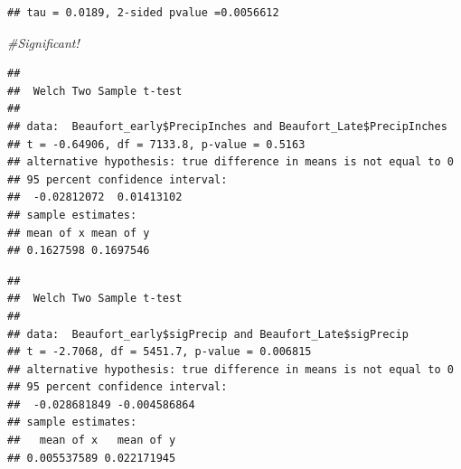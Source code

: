 \documentclass[
  12pt,
]{article}
\newenvironment{Shaded}{\begin{snugshade}}{\end{snugshade}}
\newcommand{\CommentTok}[1]{\textcolor[rgb]{0.56,0.35,0.01}{\textit{#1}}}
\newcommand{\FunctionTok}[1]{\textcolor[rgb]{0.00,0.00,0.00}{#1}}
\newcommand{\NormalTok}[1]{#1}
\newcommand{\SpecialCharTok}[1]{\textcolor[rgb]{0.00,0.00,0.00}{#1}}
\begin{document}
\begin{verbatim}
## tau = 0.0189, 2-sided pvalue =0.0056612
\end{verbatim}

\begin{Shaded}
\begin{Highlighting}[]
\CommentTok{\#Significant!}
\end{Highlighting}
\end{Shaded}

\begin{Shaded}
\end{Shaded}

\begin{verbatim}
## 
##  Welch Two Sample t-test
## 
## data:  Beaufort_early$PrecipInches and Beaufort_Late$PrecipInches
## t = -0.64906, df = 7133.8, p-value = 0.5163
## alternative hypothesis: true difference in means is not equal to 0
## 95 percent confidence interval:
##  -0.02812072  0.01413102
## sample estimates:
## mean of x mean of y 
## 0.1627598 0.1697546
\end{verbatim}

\begin{Shaded}
\end{Shaded}

\begin{verbatim}
## 
##  Welch Two Sample t-test
## 
## data:  Beaufort_early$sigPrecip and Beaufort_Late$sigPrecip
## t = -2.7068, df = 5451.7, p-value = 0.006815
## alternative hypothesis: true difference in means is not equal to 0
## 95 percent confidence interval:
##  -0.028681849 -0.004586864
## sample estimates:
##   mean of x   mean of y 
## 0.005537589 0.022171945
\end{verbatim}
\end{document}

